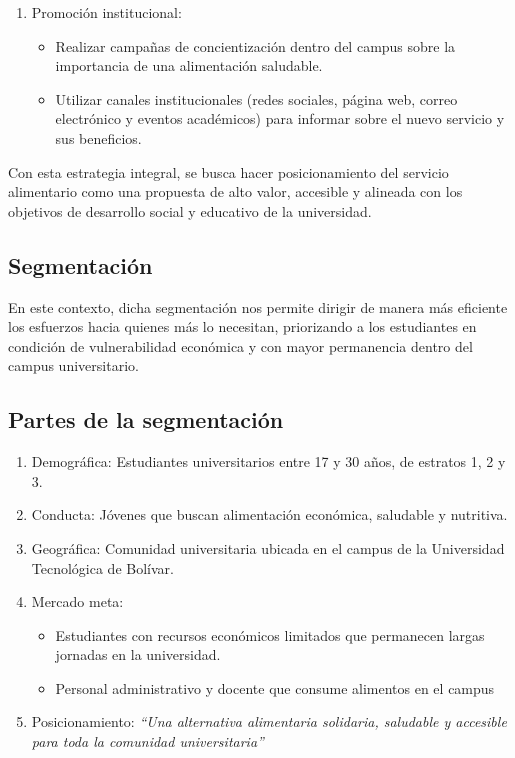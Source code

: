 \documentclass[letterpaper, 11pt]{report}
\begin{document}
\begin{enumerate}
\begin{itemize}
            \end{itemize}

      \item Promoción institucional: \begin{itemize}
                  \item Realizar campañas de concientización dentro del campus sobre la importancia de
                        una alimentación saludable.
                  \item Utilizar canales institucionales (redes sociales, página web, correo
                        electrónico y eventos académicos) para informar sobre el nuevo servicio y sus
                        beneficios.

            \end{itemize}
\end{enumerate}

Con esta estrategia integral, se busca hacer posicionamiento del servicio
alimentario como una propuesta de alto valor, accesible y alineada con los
objetivos de desarrollo social y educativo de la universidad.

\subsection{Segmentación}

En este contexto, dicha segmentación nos permite dirigir de manera más
eficiente los esfuerzos hacia quienes más lo necesitan, priorizando a los
estudiantes en condición de vulnerabilidad económica y con mayor permanencia
dentro del campus universitario.

\subsection{Partes de la segmentación}

\begin{enumerate}
      \item Demográfica: Estudiantes universitarios entre 17 y 30 años, de estratos 1, 2 y
            3.
      \item Conducta: Jóvenes que buscan alimentación económica, saludable y nutritiva.
      \item Geográfica: Comunidad universitaria ubicada en el campus de la Universidad
            Tecnológica de Bolívar.

      \item Mercado meta: \begin{itemize}
                  \item  Estudiantes con recursos económicos limitados que permanecen largas jornadas en
                        la universidad.
                  \item  Personal administrativo y docente que consume alimentos en el campus

            \end{itemize}

      \item Posicionamiento: \textit{``Una alternativa alimentaria solidaria, saludable y
                  accesible para toda la comunidad universitaria''}
\end{enumerate}
\end{document}
